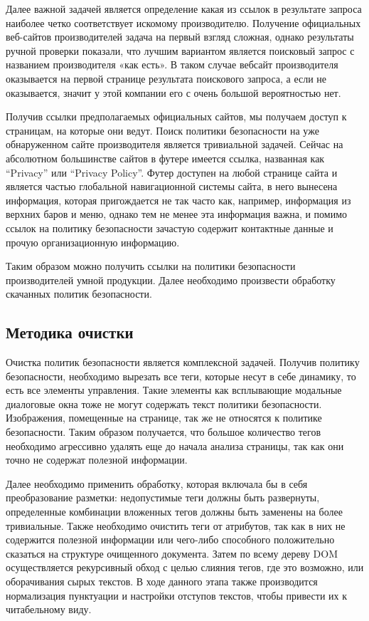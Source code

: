 \documentclass[../main]{subfiles}
\begin{document}
Далее важной задачей является определение какая из ссылок в результате запроса наиболее четко соответствует искомому производителю. Получение официальных веб-сайтов производителей задача на первый взгляд сложная, однако результаты ручной проверки показали, что лучшим вариантом является поисковый запрос с названием производителя «как есть». В таком случае вебсайт производителя оказывается на первой странице результата поискового запроса, а если не оказывается, значит у этой компании его с очень большой вероятностью нет. 

Получив ссылки предполагаемых официальных сайтов, мы получаем доступ к страницам, на которые они ведут. Поиск политики безопасности на уже обнаруженном сайте производителя является тривиальной задачей. Сейчас на абсолютном большинстве сайтов в футере имеется ссылка, названная как “Privacy” или “Privacy Policy”. Футер доступен на любой странице сайта и является частью глобальной навигационной системы сайта, в него вынесена информация, которая пригождается не так часто как, например, информация из верхних баров и меню, однако тем не менее эта информация важна, и помимо ссылок на политику безопасности зачастую содержит контактные данные и прочую организационную информацию.

Таким образом можно получить ссылки на политики безопасности производителей умной продукции. Далее необходимо произвести обработку скачанных политик безопасности.

\subsection{Методика очистки}

Очистка политик безопасности является комплексной задачей. Получив политику безопасности, необходимо вырезать все теги, которые несут в себе динамику, то есть все элементы управления. Такие элементы как всплывающие модальные диалоговые окна тоже не могут содержать текст политики безопасности. Изображения, помещенные на странице, так же не относятся к политике безопасности. Таким образом получается, что большое количество тегов необходимо агрессивно удалять еще до начала анализа страницы, так как они точно не содержат полезной информации.

Далее необходимо применить обработку, которая включала бы в себя преобразование разметки: недопустимые теги должны быть развернуты, определенные комбинации вложенных тегов должны быть заменены на более тривиальные. Также необходимо очистить теги от атрибутов, так как в них не содержится полезной информации или чего-либо способного положительно сказаться на структуре очищенного документа. Затем по всему дереву DOM осуществляется рекурсивный обход с целью слияния тегов, где это возможно, или оборачивания сырых текстов. В ходе данного этапа также производится нормализация пунктуации и настройки отступов текстов, чтобы привести их к читабельному виду. 
\end{document}
